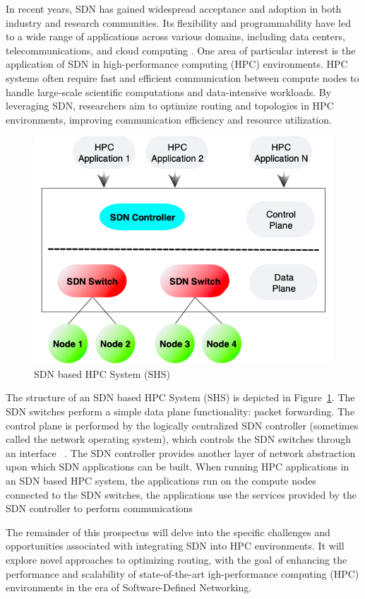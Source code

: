 In recent years, SDN has gained widespread acceptance and adoption in both industry and research communities. Its flexibility and programmability have led to a wide range of applications across various domains, including data centers, telecommunications, and cloud computing \cite{alalmaei2020sdn, faizian2017comparative}. 
One area of particular interest is the application of SDN in high-performance computing (HPC) environments. HPC systems often require fast and efficient communication between compute nodes to handle large-scale scientific computations and data-intensive workloads. By leveraging SDN, researchers aim to optimize routing and topologies in HPC environments, improving communication efficiency and resource utilization.

\begin{figure}[h]
  \centering
  \includegraphics[width=\columnwidth]{./figs/sdn_in_hpc.png}
  \caption{SDN based HPC System (SHS)}
  \label{fig:sdn_hpc}
\end{figure}

The structure of an SDN based HPC System (SHS) is depicted in Figure~\ref{fig:sdn_hpc}.
The SDN switches perform a simple data plane functionality: packet forwarding. The
control plane is performed by the logically centralized
SDN controller (sometimes called the network operating system), which controls
the SDN switches through an interface ~\cite{benzekki2016software}.
The SDN controller provides another layer of network abstraction upon which SDN
applications can be built. When running HPC applications in an SDN based HPC system,
the applications run on the compute nodes connected to the SDN switches,
the applications use the services provided by the SDN controller to perform
communications



The remainder of this prospectus will delve into the specific challenges and opportunities associated with integrating SDN into HPC environments. It will explore novel approaches to optimizing routing, with the goal of enhancing the performance and scalability of state-of-the-art igh-performance computing (HPC) environments in the era of Software-Defined Networking.

